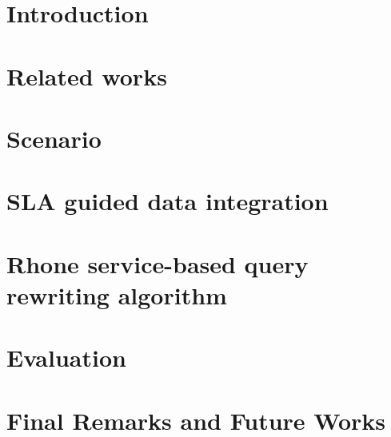 \documentclass{llncs}
\theoremstyle{plain}
\theoremstyle{plain}
\theoremstyle{plain}
\theoremstyle{plain}
\begin{document}

\section{Introduction}\label{sec:introduction}

\section{Related works}\label{sec:relatedwork}

\section{Scenario}\label{sec:scenario}

\section{SLA guided data integration}\label{sec:disla}

\section{Rhone service-based query rewriting algorithm}\label{sec:rhone}


\section{Evaluation}\label{sec:experiments}

\section{Final Remarks and Future Works}\label{sec:conclusion}


 
 

\end{document}
